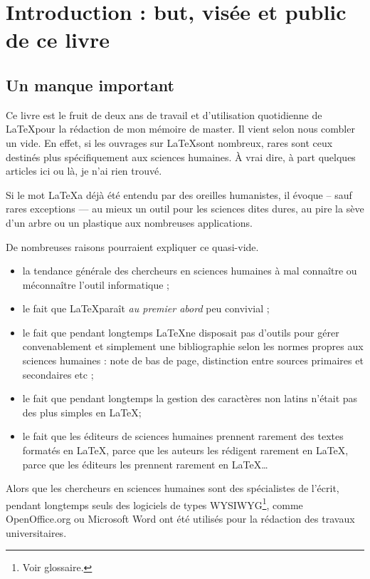 \chapter{Introduction : but, visée et public de ce livre}
\section{Un manque important}

Ce livre est le fruit de deux ans de travail et d'utilisation quotidienne de \LaTeX pour la rédaction de mon mémoire de master. Il vient selon nous combler un vide. En effet, si les ouvrages sur \LaTeX sont nombreux, rares sont ceux destinés plus spécifiquement aux sciences humaines. À vrai dire, à part quelques articles ici ou là, je n'ai rien trouvé.


Si le mot \LaTeX a déjà été entendu par des oreilles humanistes, il évoque -- sauf rares exceptions --- au mieux un outil pour les sciences dites dures, au pire la sève d'un arbre ou un plastique aux nombreuses applications. 

De nombreuses raisons pourraient expliquer ce quasi-vide.
\begin{itemize}
\item la tendance générale des chercheurs en sciences humaines à mal connaître ou méconnaître l'outil informatique ;
\item le fait que \LaTeX paraît \emph{au premier abord} peu convivial ;
\item le fait que pendant longtemps \LaTeX ne disposait pas d'outils pour gérer convenablement et simplement une bibliographie selon les normes propres aux sciences humaines : note de bas de page, distinction entre sources primaires et secondaires etc ;
\item le fait que pendant longtemps la gestion des caractères non latins n'était pas des plus simples en \LaTeX ;
\item le fait que les éditeurs de sciences humaines prennent rarement des textes formatés en \LaTeX, parce que les auteurs les rédigent rarement en \LaTeX, parce que les éditeurs les prennent rarement en \LaTeX \ldots
\end{itemize}

Alors que les chercheurs en sciences humaines sont des spécialistes de l'écrit, pendant longtemps seuls des logiciels de types WYSIWYG\footnote{Voir glossaire.}, comme OpenOffice.org ou Microsoft Word ont été utilisés pour la rédaction des travaux universitaires.

